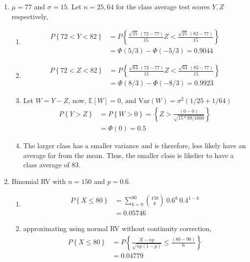 \begin{enumerate}
	
	\item $ \mu = 77$ and $ \sigma = 15 $. Let $ n = 25, 64 $ for the class average test scores $ Y, Z $ respectively,
	
		\begin{enumerate}
			\item \begin{align}
				P \left\{72 < Y < 82 \right\} &= P \left\{ \frac{\sqrt{25}\ (72 - 77)}{15} Z < \frac{\sqrt{25}\ (82 - 77)}{15} \right\} \nonumber \\
				&= \Phi (5/3) - \Phi (-5/3) = 0.9044
			\end{align}
			
			\item \begin{align}
				P \left\{72 < Z < 82 \right\} &= P \left\{ \frac{\sqrt{64}\ (72 - 77)}{15} Z < \frac{\sqrt{64}\ (82 - 77)}{15} \right\} \nonumber \\
				&= \Phi (8/3) - \Phi (-8/3) = 0.9923
			\end{align}
			
			\item Let $ W = Y - Z $, now, $ \mathbb{E}[W] = 0$, and $ \mathrm{Var}(W) = \sigma^2 (1/25 + 1/64) $\\
			\begin{align}
				P \left\{Y > Z \right\} &= P \left\{ W > 0 \right\} = \left\{ Z > \frac{(0 - 0)}{\sqrt{15*89/1600}} \right\} \nonumber \\
				&= \Phi (0) = 0.5
			\end{align}
			
			\item The larger class has a smaller variance and is therefore, less likely have an average far from the mean. Thus, the smaller class is likelier to have a class average of 83.
		\end{enumerate}
	
	
	\item Binomial RV with $ n = 150$ and $ p = 0.6 $.
	
		\begin{enumerate}
			\item \begin{align}
				P \left\{X \leq 80 \right\} &=  \sum\limits_{k=0}^{80} \binom{150}{k}\ 0.6^k\ 0.4^{1-k}\nonumber \\
				&= 0.05746
			\end{align}
			
			\item approximating using normal RV without continuity correction,
			\begin{align}
				P \left\{X \leq 80 \right\} &= P \left\{ \frac{X - np}{\sqrt{np(1-p)}} \leq \frac{(80 - 90)}{6} \right\} \nonumber \\
				&= 0.04779
			\end{align}
			

\end{enumerate}
\end{enumerate}
